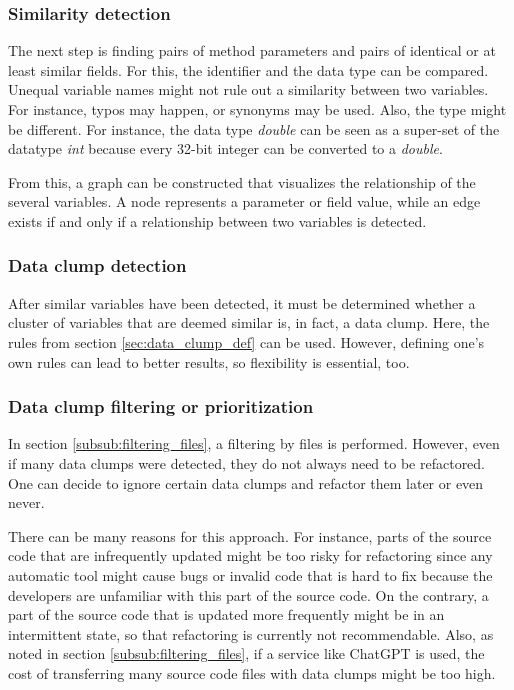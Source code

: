 \subsubsection{Similarity detection}

The next step is finding pairs of method parameters and pairs of identical or at least similar fields. For this, the identifier and the data type can be compared. Unequal variable names might not rule out a similarity between two variables. For instance, typos may happen, or synonyms may be used. Also, the type might be different. For instance, the data type \textit{double} can be seen as a super-set of the datatype \textit{int} because every 32-bit integer can be converted to a \textit{double}.

From this, a graph can be constructed that visualizes the relationship of the several variables. A node represents a parameter or field value, while an edge exists if and only if a relationship between two variables is detected. 

\subsubsection{Data clump detection}
After similar variables have been detected, it must be determined whether a cluster of variables that are deemed similar is, in fact, a data clump. Here, the rules from section \ref{sec:data_clump_def} can be used. However, defining one's own rules can lead to better results, so flexibility is essential, too. 

\subsubsection{Data clump filtering or prioritization} \label{subsub:filtering_data_clumps}
In section \ref{subsub:filtering_files}, a filtering by files is performed. However, even if many data clumps were detected, they do not always need to be refactored. One can decide to ignore certain data clumps and refactor them later or even never. 

There can be many reasons for this approach. For instance, parts of the source code that are infrequently updated might be too risky for refactoring since any automatic tool might cause bugs or invalid code that is hard to fix because the developers are unfamiliar with this part of the source code. On the contrary, a part of the source code that is updated more frequently might be in an intermittent state, so that refactoring is currently not recommendable. Also, as noted in section  \ref{subsub:filtering_files}, if a service like ChatGPT is used, the cost of transferring many source code files with data clumps might be too high. 


